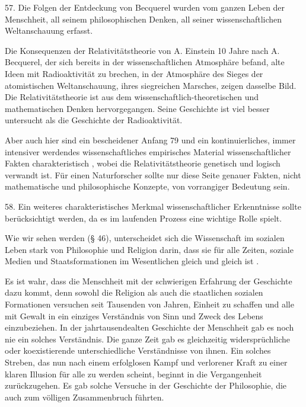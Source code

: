 \documentclass[11pt,a4paper]{book}
\begin{document}
57. Die Folgen der Entdeckung von Becquerel wurden vom ganzen Leben der Menschheit, all seinem philosophischen Denken, all seiner wissenschaftlichen Weltanschauung erfasst.



Die Konsequenzen der Relativitätstheorie von A. Einstein 10 Jahre nach A. Becquerel, der sich bereits in der wissenschaftlichen Atmosphäre befand, alte Ideen mit Radioaktivität zu brechen, in der Atmosphäre des Sieges der atomistischen Weltanschauung, ihres siegreichen Marsches, zeigen dasselbe Bild. Die Relativitätstheorie ist aus dem wissenschaftlich-theoretischen und mathematischen Denken hervorgegangen. Seine Geschichte ist viel besser untersucht als die Geschichte der Radioaktivität.



Aber auch hier sind ein bescheidener Anfang 79 und ein kontinuierliches, immer intensiver werdendes wissenschaftliches empirisches Material wissenschaftlicher Fakten charakteristisch , wobei die Relativitätstheorie genetisch und logisch verwandt ist. Für einen Naturforscher sollte nur diese Seite genauer Fakten, nicht mathematische und philosophische Konzepte, von vorrangiger Bedeutung sein.



58. Ein weiteres charakteristisches Merkmal wissenschaftlicher Erkenntnisse sollte berücksichtigt werden, da es im laufenden Prozess eine wichtige Rolle spielt.



Wie wir sehen werden (§ 46), unterscheidet sich die Wissenschaft im sozialen Leben stark von Philosophie und Religion darin, dass sie für alle Zeiten, soziale Medien und Staatsformationen im Wesentlichen gleich und gleich ist .



Es ist wahr, dass die Menschheit mit der schwierigen Erfahrung der Geschichte dazu kommt, denn sowohl die Religion als auch die staatlichen sozialen Formationen versuchen seit Tausenden von Jahren, Einheit zu schaffen und alle mit Gewalt in ein einziges Verständnis von Sinn und Zweck des Lebens einzubeziehen. In der jahrtausendealten Geschichte der Menschheit gab es noch nie ein solches Verständnis. Die ganze Zeit gab es gleichzeitig widersprüchliche oder koexistierende unterschiedliche Verständnisse von ihnen. Ein solches Streben, das nun nach einem erfolglosen Kampf und verlorener Kraft zu einer klaren Illusion für alle zu werden scheint, beginnt in die Vergangenheit zurückzugehen. Es gab solche Versuche in der Geschichte der Philosophie, die auch zum völligen Zusammenbruch führten.
\end{document}
